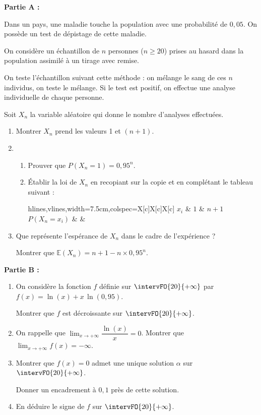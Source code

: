 \textbf{Partie A :}

\medskip

Dans un pays, une maladie touche la population avec une probabilité de $0,05$. On possède un test de dépistage de cette maladie.

On considère un échantillon de $n$ personnes ($n \geqslant 20$) prises au hasard dans la population assimilé à un tirage avec remise.

On teste l’échantillon suivant cette méthode : on mélange le sang de ces $n$ individus, on teste le mélange. Si le test est positif, on effectue une analyse individuelle de chaque personne.

Soit $X_n$ la variable aléatoire qui donne le nombre d’analyses effectuées.

\begin{enumerate}
	\item Montrer $X_n$ prend les valeurs 1 et $(n+1)$.
	\item 
	\begin{enumerate}
		\item Prouver que $P(X_n=1)=0,95^n$.
		\item Établir la loi de $X_n$ en recopiant sur la copie et en complétant le tableau suivant :
		\begin{center}
			\begin{tblr}{hlines,vlines,width=7.5cm,colspec={X[c]X[c]X[c]}}
				$x_i$ & $1$ & $n+1$ \\
				$P(X_n=x_i)$ & & \\
			\end{tblr}
		\end{center}
	\end{enumerate}
	\item Que représente l’espérance de $X_n$ dans le cadre de l’expérience ?
	
	Montrer que $\mathbb{E}\left(X_n\right) = n+1 - n \times 0,95^n$.
\end{enumerate}

\smallskip

\textbf{Partie B :}

\smallskip

\begin{enumerate}
	\item On considère la fonction $f$ définie sur $\intervFO{20}{+\infty}$ par $f(x)=\ln(x)+x\,\ln(0,95)$.
	
	Montrer que $f$ est décroissante sur $\intervFO{20}{+\infty}$.
	\item On rappelle que $\displaystyle\lim_{x \to +\infty} \dfrac{\ln(x)}{x} = 0$. Montrer que $\displaystyle\lim_{x \to +\infty} f(x) = -\infty$.
	\item Montrer que $f(x)=0$ admet une unique solution $\alpha$ sur $\intervFO{20}{+\infty}$.
	
	Donner un encadrement à $0,1$ près de cette solution.
	\item En déduire le signe de $f$ sur $\intervFO{20}{+\infty}$.
\end{enumerate}

